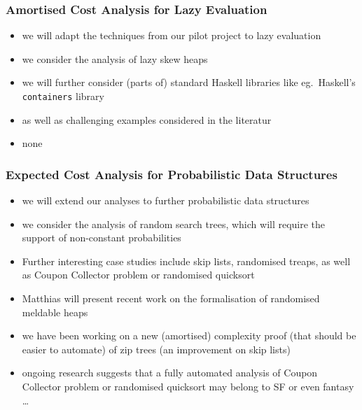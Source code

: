 \documentclass[
11pt,
usepdftitle=false,
aspectratio=169,
xcolor={table,usenames,dvipsnames},
]{beamer}
\newcommand{\BLUE}[1]{{\color{blue}#1}}
\begin{document}
\begin{frame}
  \frametitle{Amortised Cost Analysis for Lazy Evaluation}
   \vspace{-1ex}
  \begin{itemize}
  \item we will adapt the techniques from our pilot project to lazy evaluation
  \end{itemize}

  \medskip
  
  \begin{itemize}
  \item we consider the analysis of \BLUE{lazy skew heaps}
  \item we will further consider (parts of) standard Haskell libraries like
    eg.\ Haskell's \texttt{containers} library
  \item as well as challenging examples considered in the literatur
  \end{itemize}

  \medskip
  
  \begin{itemize}
  \item none \smiley
  \end{itemize}

\end{frame}

\begin{frame}
  \frametitle{Expected Cost Analysis for Probabilistic Data Structures}
  \vspace{-1ex}
  \begin{itemize}
  \item we will extend our analyses to further probabilistic data structures
  \end{itemize}

  \medskip
  
  \begin{itemize}
  \item we consider the analysis of \BLUE{random search trees}, which will require the support of non-constant probabilities
  \item Further interesting case studies include \BLUE{skip lists}, \BLUE{randomised treaps}, as well as
    \BLUE{Coupon Collector problem} or \BLUE{randomised quicksort}
  \end{itemize}

  \medskip
  
  \begin{itemize}
  \item Matthias will present recent work on the formalisation of \alert{randomised meldable heaps}
  \item we have been working on a new (amortised) complexity proof (that should be easier to automate)
    of \alert{zip trees} (an improvement on skip lists)
  \item<4-> ongoing research suggests that a fully automated analysis of \BLUE{Coupon Collector problem} or \BLUE{randomised quicksort} may belong to SF or even fantasy \dots
  \end{itemize}
\end{frame}
\end{document}
